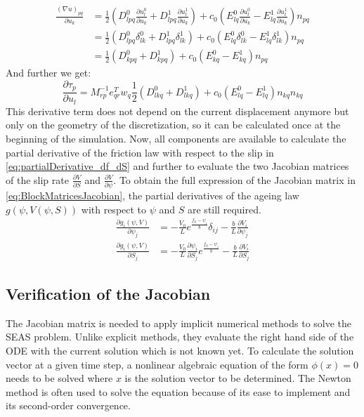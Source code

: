 \documentclass{report}
\begin{document}
\begin{align}
    \frac{(\nabla u)_{pq}}{\partial u_k} &= \frac{1}{2}\left(D_{lpq}^0\frac{\partial u_l^0}{\partial u_k} + D_{lpq}^1\frac{\partial u_l^1}{\partial u_k}\right) + c_0\left(E_{lq}^0\frac{\partial u_l^0}{\partial u_k} - E_{lq}^1\frac{\partial u_l^1}{\partial u_k}\right)n_{pq} \\
    &= \frac{1}{2}\left(D_{lpq}^0\delta_{lk}^0 + D_{lpq}^1\delta_{lk}^1\right) + c_0\left(E_{lq}^0\delta_{lk}^0 - E_{lq}^1\delta_{lk}^1\right)n_{pq} \\
    &= \frac{1}{2}\left(D_{kpq}^0 + D_{kpq}^1\right) + c_0\left(E_{kq}^0 - E_{kq}^1\right)n_{pq} 
\end{align}
And further we get: 
\begin{equation}
    \frac{\partial \tau_p}{\partial u_l} = M_{rp}^{-1}e_{qr}^Tw_q
    \frac{1}{2}\left(D_{lkq}^0 + D_{lkq}^1\right) + c_0\left(E_{lq}^0 - E_{lq}^1\right)n_{kq}
    n_{kq} 
\end{equation}
This derivative term does not depend on the current displacement anymore but only on the geometry of the discretization, so it can be calculated once at the beginning of the simulation. Now, all components are available to calculate the partial derivative of the friction law with respect to the slip in \autoref{eq:partialDerivative_df_dS} and further to evaluate the two Jacobian matrices of the slip rate $\frac{\partial V}{\partial S}$ and $\frac{\partial V}{\partial \psi}$. To obtain the full expression of the Jacobian matrix in \autoref{eq:BlockMatricesJacobian}, the partial derivatives of the ageing law $g(\psi, V(\psi,S))$ with respect to $\psi$ and $S$ are still required.
\begin{align}
    \frac{\partial g_i(\psi,V)}{\partial\psi_j} &= -\frac{V_0}{L}e^{\frac{f_0-\psi_i}{b}}\delta_{ij} - \frac{b}{L}\frac{\partial V_i}{\partial \psi_j} \\
    \frac{\partial g_i(\psi,V)}{\partial S_j} &= -\frac{V_0}{L}\frac{\partial\psi_i}{\partial S_j}e^{\frac{f_0-\psi_i}{b}} - \frac{b}{L}\frac{\partial V_i}{\partial S_j}
\end{align}

\subsection{Verification of the Jacobian}
The Jacobian matrix is needed to apply implicit numerical methods to solve the SEAS problem. Unlike explicit methods, they evaluate the right hand side of the ODE with the current solution which is not known yet. To calculate the solution vector at a given time step, a nonlinear algebraic equation of the form $\phi(x) = 0$ needs to be solved where $x$ is the solution vector to be determined. The Newton method is often used to solve the equation because of its ease to implement and its second-order convergence. 
\end{document}
